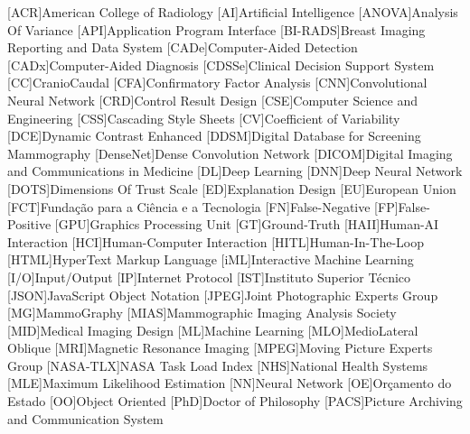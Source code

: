 
\begin{acronym}[H.264/SVC]
[ACR]{American College of Radiology}
[AI]{Artificial Intelligence}
[ANOVA]{Analysis Of Variance}
[API]{Application Program Interface}
[BI-RADS]{Breast Imaging Reporting and Data System}
[CADe]{Computer-Aided Detection}
[CADx]{Computer-Aided Diagnosis}
[CDSSe]{Clinical Decision Support System}
[CC]{CranioCaudal}
[CFA]{Confirmatory Factor Analysis}
[CNN]{Convolutional Neural Network}
[CRD]{Control Result Design}
[CSE]{Computer Science and Engineering}
[CSS]{Cascading Style Sheets}
[CV]{Coefficient of Variability}
[DCE]{Dynamic Contrast Enhanced}
[DDSM]{Digital Database for Screening Mammography}
[DenseNet]{Dense Convolution Network}
[DICOM]{Digital Imaging and Communications in Medicine}
[DL]{Deep Learning}
[DNN]{Deep Neural Network}
[DOTS]{Dimensions Of Trust Scale}
[ED]{Explanation Design}
[EU]{European Union}
[FCT]{Funda\c{c}\~{a}o para a Ci\^{e}ncia e a Tecnologia}
[FN]{False-Negative}
[FP]{False-Positive}
[GPU]{Graphics Processing Unit}
[GT]{Ground-Truth}
[HAII]{Human-AI Interaction}
[HCI]{Human-Computer Interaction}
[HITL]{Human-In-The-Loop}
[HTML]{HyperText Markup Language}
[iML]{Interactive Machine Learning}
[I/O]{Input/Output}
[IP]{Internet Protocol}
[IST]{Instituto Superior T\'{e}cnico}
[JSON]{JavaScript Object Notation}
[JPEG]{Joint Photographic Experts Group}
[MG]{MammoGraphy}
[MIAS]{Mammographic Imaging Analysis Society}
[MID]{Medical Imaging Design}
[ML]{Machine Learning}
[MLO]{MedioLateral Oblique}
[MRI]{Magnetic Resonance Imaging}
[MPEG]{Moving Picture Experts Group}
[NASA-TLX]{NASA Task Load Index}
[NHS]{National Health Systems}
[MLE]{Maximum Likelihood Estimation}
[NN]{Neural Network}
[OE]{Or\c{c}amento do Estado}
[OO]{Object Oriented}
[PhD]{Doctor of Philosophy}
[PACS]{Picture Archiving and Communication System}

\end{acronym}
